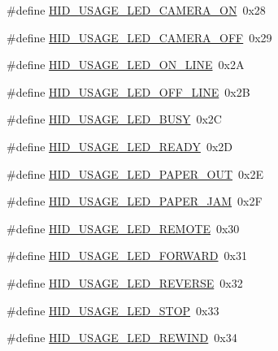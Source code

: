 \begin{DoxyCompactItemize}
\item 
\#define \hyperlink{group__USBD__HID_ga1a69b383c0a897a64f1dbb771ccdfa5d}{H\+I\+D\+\_\+\+U\+S\+A\+G\+E\+\_\+\+L\+E\+D\+\_\+\+C\+A\+M\+E\+R\+A\+\_\+\+ON}~0x28
\item 
\#define \hyperlink{group__USBD__HID_ga89791b1709215a18b35cda2e0a66c8fa}{H\+I\+D\+\_\+\+U\+S\+A\+G\+E\+\_\+\+L\+E\+D\+\_\+\+C\+A\+M\+E\+R\+A\+\_\+\+O\+FF}~0x29
\item 
\#define \hyperlink{group__USBD__HID_ga307a23de9b1083caade208deff40b920}{H\+I\+D\+\_\+\+U\+S\+A\+G\+E\+\_\+\+L\+E\+D\+\_\+\+O\+N\+\_\+\+L\+I\+NE}~0x2A
\item 
\#define \hyperlink{group__USBD__HID_ga6da65a1c9447187f5430c6772221da77}{H\+I\+D\+\_\+\+U\+S\+A\+G\+E\+\_\+\+L\+E\+D\+\_\+\+O\+F\+F\+\_\+\+L\+I\+NE}~0x2B
\item 
\#define \hyperlink{group__USBD__HID_ga157655e74dad2e60c7929233a52e3d77}{H\+I\+D\+\_\+\+U\+S\+A\+G\+E\+\_\+\+L\+E\+D\+\_\+\+B\+U\+SY}~0x2C
\item 
\#define \hyperlink{group__USBD__HID_ga98027a4d156282b93051f21d18be0003}{H\+I\+D\+\_\+\+U\+S\+A\+G\+E\+\_\+\+L\+E\+D\+\_\+\+R\+E\+A\+DY}~0x2D
\item 
\#define \hyperlink{group__USBD__HID_ga593e39843a519d683a85f6b394730385}{H\+I\+D\+\_\+\+U\+S\+A\+G\+E\+\_\+\+L\+E\+D\+\_\+\+P\+A\+P\+E\+R\+\_\+\+O\+UT}~0x2E
\item 
\#define \hyperlink{group__USBD__HID_ga689e4d119f74e5c53075ad779d6e5136}{H\+I\+D\+\_\+\+U\+S\+A\+G\+E\+\_\+\+L\+E\+D\+\_\+\+P\+A\+P\+E\+R\+\_\+\+J\+AM}~0x2F
\item 
\#define \hyperlink{group__USBD__HID_ga82eef373cb43c0bdf6dabe0b82f67f04}{H\+I\+D\+\_\+\+U\+S\+A\+G\+E\+\_\+\+L\+E\+D\+\_\+\+R\+E\+M\+O\+TE}~0x30
\item 
\#define \hyperlink{group__USBD__HID_ga3a3f725a341f5265875f8690d54d4517}{H\+I\+D\+\_\+\+U\+S\+A\+G\+E\+\_\+\+L\+E\+D\+\_\+\+F\+O\+R\+W\+A\+RD}~0x31
\item 
\#define \hyperlink{group__USBD__HID_ga3d2000b30d154ff1a041cd77aef083ed}{H\+I\+D\+\_\+\+U\+S\+A\+G\+E\+\_\+\+L\+E\+D\+\_\+\+R\+E\+V\+E\+R\+SE}~0x32
\item 
\#define \hyperlink{group__USBD__HID_ga05bd9837d9c360ba67a3cff43f664698}{H\+I\+D\+\_\+\+U\+S\+A\+G\+E\+\_\+\+L\+E\+D\+\_\+\+S\+T\+OP}~0x33
\item 
\#define \hyperlink{group__USBD__HID_ga18ef8eb8f894def11e7bcbea1eddcbe3}{H\+I\+D\+\_\+\+U\+S\+A\+G\+E\+\_\+\+L\+E\+D\+\_\+\+R\+E\+W\+I\+ND}~0x34
\item 

\end{DoxyCompactItemize}
